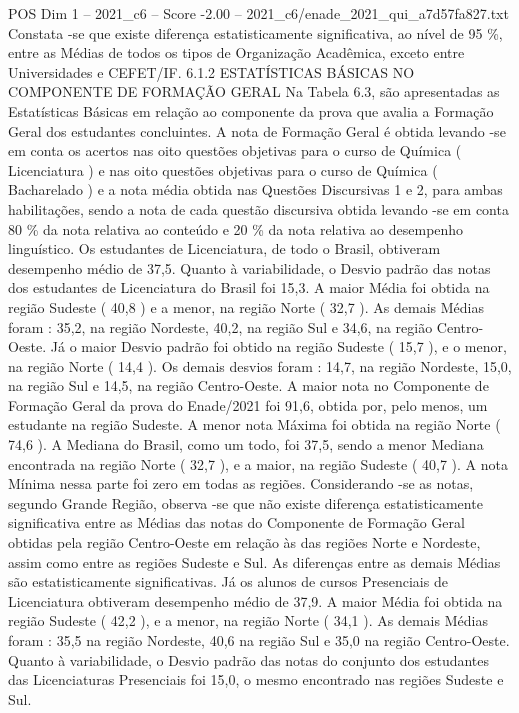 \begin{textsample}{POS Dim 1 – 2021\_c6 – Score -2.00 – 2021\_c6/enade\_2021\_qui\_a7d57fa827.txt}
Constata -se que existe diferença estatisticamente significativa, ao nível de 95 \%, entre as Médias de todos os tipos de Organização Acadêmica, exceto entre Universidades e CEFET/IF. 6.1.2 ESTATÍSTICAS BÁSICAS NO COMPONENTE DE FORMAÇÃO GERAL Na Tabela 6.3, são apresentadas as Estatísticas Básicas em relação ao componente da prova que avalia a Formação Geral dos estudantes concluintes.
A nota de Formação Geral é obtida levando -se em conta os acertos nas oito questões objetivas para o curso de Química ( Licenciatura ) e nas oito questões objetivas para o curso de Química ( Bacharelado ) e a nota média obtida nas Questões Discursivas 1 e 2, para ambas habilitações, sendo a nota de cada questão discursiva obtida levando -se em conta 80 \% da nota relativa ao conteúdo e 20 \% da nota relativa ao desempenho linguístico.
Os estudantes de Licenciatura, de todo o Brasil, obtiveram desempenho médio de 37,5.
Quanto à variabilidade, o Desvio padrão das notas dos estudantes de Licenciatura do Brasil foi 15,3.
A maior Média foi obtida na região Sudeste ( 40,8 ) e a menor, na região Norte ( 32,7 ).
As demais Médias foram : 35,2, na região Nordeste, 40,2, na região Sul e 34,6, na região Centro-Oeste.
Já o maior Desvio padrão foi obtido na região Sudeste ( 15,7 ), e o menor, na região Norte ( 14,4 ).
Os demais desvios foram : 14,7, na região Nordeste, 15,0, na região Sul e 14,5, na região Centro-Oeste.
A maior nota no Componente de Formação Geral da prova do Enade/2021 foi 91,6, obtida por, pelo menos, um estudante na região Sudeste.
A menor nota Máxima foi obtida na região Norte ( 74,6 ).
A Mediana do Brasil, como um todo, foi 37,5, sendo a menor Mediana encontrada na região Norte ( 32,7 ), e a maior, na região Sudeste ( 40,7 ).
A nota Mínima nessa parte foi zero em todas as regiões.
Considerando -se as notas, segundo Grande Região, observa -se que não existe diferença estatisticamente significativa entre as Médias das notas do Componente de Formação Geral obtidas pela região Centro-Oeste em relação às das regiões Norte e Nordeste, assim como entre as regiões Sudeste e Sul.
As diferenças entre as demais Médias são estatisticamente significativas.
Já os alunos de cursos Presenciais de Licenciatura obtiveram desempenho médio de 37,9.
A maior Média foi obtida na região Sudeste ( 42,2 ), e a menor, na região Norte ( 34,1 ).
As demais Médias foram : 35,5 na região Nordeste, 40,6 na região Sul e 35,0 na região Centro-Oeste.
Quanto à variabilidade, o Desvio padrão das notas do conjunto dos estudantes das Licenciaturas Presenciais foi 15,0, o mesmo encontrado nas regiões Sudeste e Sul.

\end{textsample}
